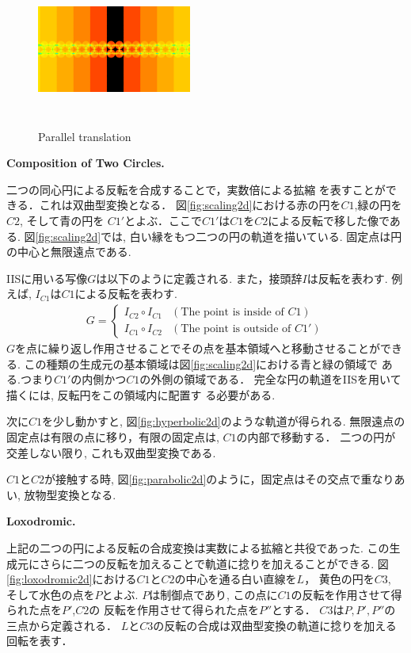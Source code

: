 \begin{figure}[h!tbp]
\begin{minipage}[t]{0.3\hsize}
  \center
  \includegraphics[width=2in, height=2in, keepaspectratio]{../img/klein/2diis/translation.pdf}
  \caption{Parallel translation}
  \label{fig:translation2d}
 \end{minipage}
\end{figure}

\noindent\textbf{Composition of Two Circles.}

二つの同心円による反転を合成することで，実数倍による拡縮
を表すことができる．これは双曲型変換となる．
図\ref{fig:scaling2d}における赤の円を$C1$,緑の円を$C2$, そして青の円を
$C1'$とよぶ．ここで$C1'$は$C1$を$C2$による反転で移した像である.
図\ref{fig:scaling2d}では, 白い縁をもつ二つの円の軌道を描いている.
固定点は円の中心と無限遠点である.

IISに用いる写像$G$は以下のように定義される.
また，接頭辞$I$は反転を表わす.
例えば, $I_{C1}$は$C1$による反転を表わす.
\begin{align*}
 G =
  \begin{cases}
   I_{C2} \circ I_{C1} & (\text{The point is inside of } C1) \\
   I_{C1} \circ I_{C2} & (\text{The point is outside of } C1')
  \end{cases}
\end{align*}
$G$を点に繰り返し作用させることでその点を基本領域へと移動させることができる.
この種類の生成元の基本領域は図\ref{fig:scaling2d}における青と緑の領域で
ある.つまり$C1'$の内側かつ$C1$の外側の領域である．
完全な円の軌道をIISを用いて描くには, 反転円をこの領域内に配置す
る必要がある.

次に$C1$を少し動かすと, 図\ref{fig:hyperbolic2d}のような軌道が得られる.
無限遠点の固定点は有限の点に移り，有限の固定点は, $C1$の内部で移動する．
二つの円が交差しない限り, これも双曲型変換である.

$C1$と$C2$が接触する時, 図\ref{fig:parabolic2d}のように，固定点はその交点で重なりあい, 放物型変換となる.

\noindent\textbf{Loxodromic.}

上記の二つの円による反転の合成変換は実数による拡縮と共役であった.
この生成元にさらに二つの反転を加えることで軌道に捻りを加えることができる.
図\ref{fig:loxodromic2d}における$C1$と$C2$の中心を通る白い直線を$L$，
黄色の円を$C3$, そして水色の点を$P$とよぶ.
$P$は制御点であり, この点に$C1$の反転を作用させて得られた点を$P'$,$C2$の
反転を作用させて得られた点を$P''$とする．
$C3$は$P, P', P''$の三点から定義される．
$L$と$C3$の反転の合成は双曲型変換の軌道に捻りを加える回転を表す．

